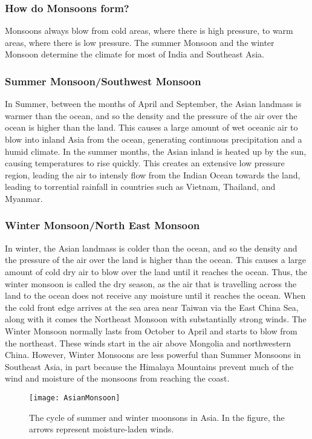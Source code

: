 \subsubsection{How do Monsoons form?}
Monsoons always blow from cold areas, where there is high pressure, to warm areas, where there is low pressure. The summer Monsoon and the winter Monsoon determine the climate for most of India and Southeast Asia. \citep{monsoonform}
 
\subsubsection{Summer Monsoon/Southwest Monsoon}
In Summer, between the months of April and September, the Asian landmass is warmer than the ocean, and so the density and the pressure of the air over the ocean is higher than the land. This causes a large amount of wet oceanic air to blow into inland Asia from the ocean, generating continuous precipitation and a humid climate. In the summer months, the Asian inland is heated up by the sun, causing temperatures to rise quickly. This creates an extensive low pressure region, leading the air to intensly flow from the Indian Ocean towards the land, leading to torrential rainfall in countries such as Vietnam, Thailand, and Myanmar. \citep{monsoonform}

\subsubsection{Winter Monsoon/North East Monsoon}
In winter, the Asian landmass is colder than the ocean, and so the density and the pressure of the air over the land is higher than the ocean. This causes a large amount of cold dry air to blow over the land until it reaches the ocean. Thus, the winter monsoon is called the dry season, as the air that is travelling across the land to the ocean does not receive any moisture until it reaches the ocean. When the cold front edge arrives at the sea area near Taiwan via the East China Sea, along with it comes the Northeast Monsoon with substantially strong winds. The Winter Monsoon normally lasts from October to April and starts to blow from the northeast. These winds start in the air above Mongolia and northwestern China. However, Winter Monsoons are less powerful than Summer Monsoons in Southeast Asia, in part because the Himalaya Mountains prevent much of the wind and moisture of the monsoons from reaching the coast. \citep{monsoonform}
 
 \begin{figure}[h!]
  \centering
  \texttt{[image: AsianMonsoon]}
  \caption{The cycle of summer and winter moonsons in Asia. In the figure, the arrows represent moisture-laden winds.}
  \label{fig:asianmonsoon}
\end{figure}
 
